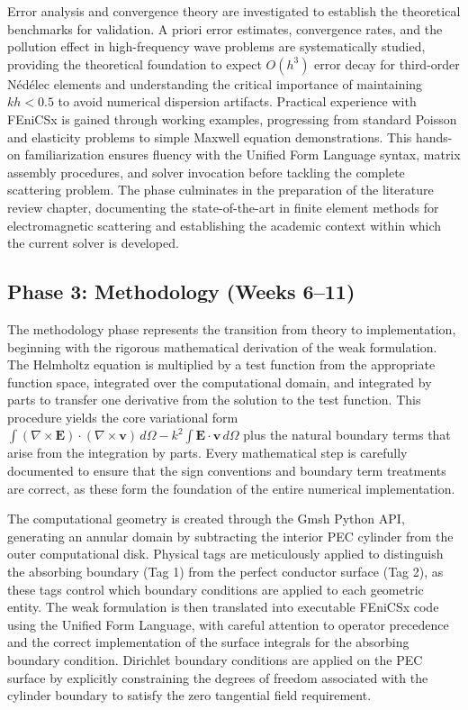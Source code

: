 \documentclass[class=report, crop=false]{standalone}
\begin{document}
Error analysis and convergence theory are investigated to establish the theoretical benchmarks for validation. A priori error estimates, convergence rates, and the pollution effect in high-frequency wave problems are systematically studied, providing the theoretical foundation to expect $O(h^3)$ error decay for third-order Nédélec elements and understanding the critical importance of maintaining $kh < 0.5$ to avoid numerical dispersion artifacts. Practical experience with FEniCSx is gained through working examples, progressing from standard Poisson and elasticity problems to simple Maxwell equation demonstrations. This hands-on familiarization ensures fluency with the Unified Form Language syntax, matrix assembly procedures, and solver invocation before tackling the complete scattering problem. The phase culminates in the preparation of the literature review chapter, documenting the state-of-the-art in finite element methods for electromagnetic scattering and establishing the academic context within which the current solver is developed.

\subsection{Phase 3: Methodology (Weeks 6--11)}

The methodology phase represents the transition from theory to implementation, beginning with the rigorous mathematical derivation of the weak formulation. The Helmholtz equation is multiplied by a test function from the appropriate function space, integrated over the computational domain, and integrated by parts to transfer one derivative from the solution to the test function. This procedure yields the core variational form $\int (\nabla \times \bm{E}) \cdot (\nabla \times \bm{v}) \, d\Omega - k^2 \int \bm{E} \cdot \bm{v} \, d\Omega$ plus the natural boundary terms that arise from the integration by parts. Every mathematical step is carefully documented to ensure that the sign conventions and boundary term treatments are correct, as these form the foundation of the entire numerical implementation.

The computational geometry is created through the Gmsh Python API, generating an annular domain by subtracting the interior PEC cylinder from the outer computational disk. Physical tags are meticulously applied to distinguish the absorbing boundary (Tag 1) from the perfect conductor surface (Tag 2), as these tags control which boundary conditions are applied to each geometric entity. The weak formulation is then translated into executable FEniCSx code using the Unified Form Language, with careful attention to operator precedence and the correct implementation of the surface integrals for the absorbing boundary condition. Dirichlet boundary conditions are applied on the PEC surface by explicitly constraining the degrees of freedom associated with the cylinder boundary to satisfy the zero tangential field requirement.
\end{document}
